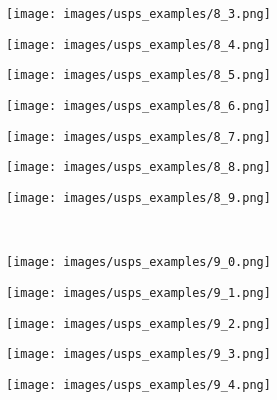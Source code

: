 \begin{figure}[t]
\begin{subfigure}[c]{0.07\textwidth}
  \centering
  \texttt{[image: images/usps\_examples/8\_3.png]}
 \end{subfigure}
 \begin{subfigure}[c]{0.07\textwidth}
  \centering
  \texttt{[image: images/usps\_examples/8\_4.png]}
 \end{subfigure}
 \begin{subfigure}[c]{0.07\textwidth}
  \centering
  \texttt{[image: images/usps\_examples/8\_5.png]}
 \end{subfigure}
 \begin{subfigure}[c]{0.07\textwidth}
  \centering
  \texttt{[image: images/usps\_examples/8\_6.png]}
 \end{subfigure}
 \begin{subfigure}[c]{0.07\textwidth}
  \centering
  \texttt{[image: images/usps\_examples/8\_7.png]}
 \end{subfigure}
 \begin{subfigure}[c]{0.07\textwidth}
  \centering
  \texttt{[image: images/usps\_examples/8\_8.png]}
 \end{subfigure}
 \begin{subfigure}[c]{0.07\textwidth}
  \centering
  \texttt{[image: images/usps\_examples/8\_9.png]}
 \end{subfigure}
 \\
 \begin{subfigure}[c]{0.07\textwidth}
  \centering
  \texttt{[image: images/usps\_examples/9\_0.png]}
 \end{subfigure}
 \begin{subfigure}[c]{0.07\textwidth}
  \centering
  \texttt{[image: images/usps\_examples/9\_1.png]}
 \end{subfigure}
 \begin{subfigure}[c]{0.07\textwidth}
  \centering
  \texttt{[image: images/usps\_examples/9\_2.png]}
 \end{subfigure}
 \begin{subfigure}[c]{0.07\textwidth}
  \centering
  \texttt{[image: images/usps\_examples/9\_3.png]}
 \end{subfigure}
 \begin{subfigure}[c]{0.07\textwidth}
  \centering
  \texttt{[image: images/usps\_examples/9\_4.png]}
 \end{subfigure}
 \begin{subfigure}[c]{0.07\textwidth}

\end{subfigure}
\end{figure}
